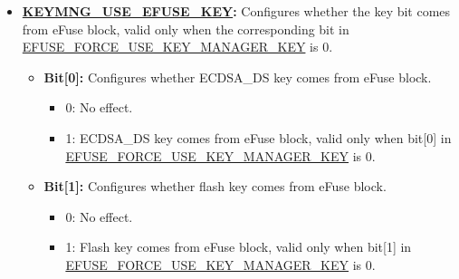 \documentclass[main\_\_EN.tex]{subfiles}
\begin{document}
\begin{enumerate}
\begin{itemize}
\begin{itemize}
\begin{itemize}
                \end{itemize}
            \item \textbf{Bit[3]}: Configures whether RSA\_DS\_KEY must come from the Key Manager.
                \begin{itemize}
                    \item 0: RSA\_DS\_KEY does not have to come from the Key Manager.
                    \item 1: RSA\_DS\_KEY must come from the Key Manager.
                \end{itemize}
            \item \textbf{Bit[4]}: Configures whether PSRAM key must come from the Key Manager.
                \begin{itemize}
                    \item 0: PSRAM key does not have to come from the Key Manager.
                    \item 1: PSRAM key must come from the Key Manager.
                \end{itemize}
        \end{itemize}
        \item \textbf{\hyperref[fielddesc:KEYMNGUSEEFUSEKEY]{KEYMNG\_USE\_EFUSE\_KEY}:} Configures whether the key bit comes from eFuse block, valid only when the corresponding bit in \hyperref[fielddesc:EFUSEFORCEUSEKEYMANAGERKEY]{EFUSE\_FORCE\_USE\_KEY\_MANAGER\_KEY} is 0.
        \begin{itemize}
            \item \textbf{Bit[0]:} Configures whether ECDSA\_DS key comes from eFuse block.
                \begin{itemize}
                    \item 0: No effect.
                    \item 1: ECDSA\_DS key comes from eFuse block, valid only when bit[0] in \hyperref[fielddesc:EFUSEFORCEUSEKEYMANAGERKEY]{EFUSE\_FORCE\_USE\_KEY\_MANAGER\_KEY} is 0.
                \end{itemize}
            \item \textbf{Bit[1]:} Configures whether flash key comes from eFuse block.
                \begin{itemize}
                    \item 0: No effect.
                    \item 1: Flash key comes from eFuse block, valid only when bit[1] in \hyperref[fielddesc:EFUSEFORCEUSEKEYMANAGERKEY]{EFUSE\_FORCE\_USE\_KEY\_MANAGER\_KEY} is 0.

\end{itemize}
\end{itemize}
\end{itemize}
\end{enumerate}
\end{document}
